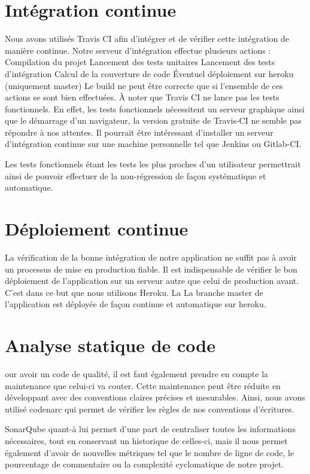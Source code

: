 \documentclass[12pt,a4paper,oneside]{book}
\begin{document}
	\section{Intégration continue}
	Nous avons utilisés Travis CI afin d’intégrer et de vérifier cette intégration de manière continue. Notre serveur d’intégration effectue plusieurs actions : 
	Compilation du projet 
	Lancement des tests unitaires
	Lancement des tests d’intégration
	Calcul de la couverture de code
	Éventuel déploiement sur heroku (uniquement master)
	Le build ne peut être correcte que si l’ensemble de ces actions se sont bien effectuées. 
	À noter que Travis CI ne lance pas les tests fonctionnels. En effet, les tests fonctionnels nécessitent un serveur graphique ainsi que le démarrage d’un navigateur, la version gratuite de Travis-CI ne semble pas répondre à nos attentes. Il pourrait être intéressant d’installer un serveur d’intégration continue sur une machine personnelle tel que Jenkins ou Gitlab-CI.
	
	Les tests fonctionnels étant les tests les plus proches d’un utilisateur permettrait ainsi de pouvoir effectuer de la non-régression de façon systématique et automatique.
	
	\section{Déploiement continue}
	La vérification de la bonne intégration de notre application ne suffit pas à avoir un processus de mise en production fiable. Il est indispensable de vérifier le bon déploiement de l’application sur un serveur autre que celui de production avant. C’est dans ce but que nous utilisons Heroku. La La branche master de l'application est déployée de façon continue et automatique sur heroku.
	
	\section{Analyse statique de code}
	our avoir un code de qualité, il est faut également prendre en compte la maintenance que celui-ci va couter. Cette maintenance peut être réduite en développant avec des conventions claires précises et mesurables. 
	Ainsi, nous avons utilisé codenarc qui permet de vérifier les règles de nos conventions d’écritures. 
	
	SonarQube quant-à lui permet d’une part de centraliser toutes les informations nécessaires, tout en conservant un historique de celles-ci, mais il nous permet également d’avoir de nouvelles métriques tel que le nombre de ligne de code, le pourcentage de commentaire ou la complexité cyclomatique de notre projet. 
	
\end{document}
